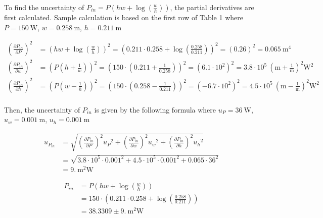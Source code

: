To find the uncertainty of $P_{in}=P \left(h w + \log{\left(\frac{w}{h} \right)}\right)$, the partial derivatives are first calculated. Sample calculation is based on the first row of Table 1 where $P=150~\text{W}$, $w=0.258~\text{m}$, $h=0.211~\text{m}$

\begin{equation*}
\begin{aligned}
\left(\frac{\partial P_{in}}{\partial P}\right)^2&=\left(h w + \log{\left(\frac{w}{h} \right)}\right)^2=\left(0.211 \cdot 0.258 + \log{\left(\frac{0.258}{0.211} \right)}\right)^2=\left(0.26\right)^2=0.065~\text{m}^{4}\\
\left(\frac{\partial P_{in}}{\partial w}\right)^2&=\left(P \left(h + \frac{1}{w}\right)\right)^2=\left(150 \cdot \left(0.211 + \frac{1}{0.258}\right)\right)^2=\left(6.1 \cdot 10^{2}\right)^2=3.8 \cdot 10^{5}~\left(\text{m} + \frac{1}{\text{m}}\right)^{2} \text{W}^{2}\\
\left(\frac{\partial P_{in}}{\partial h}\right)^2&=\left(P \left(w - \frac{1}{h}\right)\right)^2=\left(150 \cdot \left(0.258 - \frac{1}{0.211}\right)\right)^2=\left(-6.7 
\cdot 10^{2}\right)^2=4.5 \cdot 10^{5}~\left(\text{m} - \frac{1}{\text{m}}\right)^{2} \text{W}^{2}\\
\end{aligned}
\end{equation*}

Then, the uncertainty of $P_{in}$ is given by the following formula where $u_{P}=36~\text{W}$, $u_{w}=0.001~\text{m}$, $u_{h}=0.001~\text{m}$

\begin{equation*}
\begin{aligned}
u_{P_{in}}&=\sqrt{
\left(\frac{\partial P_{in}}{\partial P}\right)^2{u_P}^2+\left(\frac{\partial P_{in}}{\partial w}\right)^2{u_w}^2+\left(\frac{\partial P_{in}}{\partial h}\right)^2{u_h}^2}\\
&=\sqrt{3.8 \cdot 10^{5} \cdot 0.001^{2} + 4.5 \cdot 10^{5} \cdot 0.001^{2} + 0.065 \cdot 36^{2}}\\
&=9.~\text{m}^{2} \text{W}
\end{aligned}
\end{equation*}

\begin{equation*}
\begin{aligned}
P_{in}&=P \left(h w + \log{\left(\frac{w}{h} \right)}\right)\\
&=150 \cdot \left(0.211 \cdot 0.258 + \log{\left(\frac{0.258}{0.211} \right)}\right)\\
&=38.3309 \pm 9.~\text{m}^{2} \text{W}
\end{aligned}
\end{equation*}